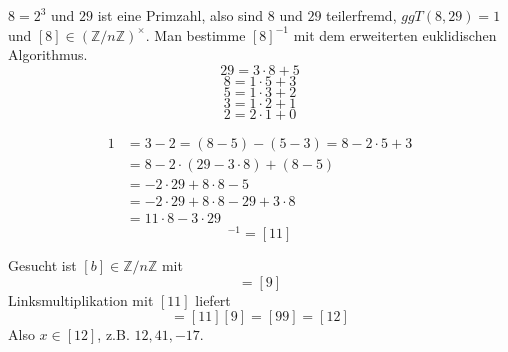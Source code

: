 \documentclass[10pt,a4paper]{article}
\begin{document}
$8 = 2^{3}$ und $29$ ist eine Primzahl, also sind $8$ und $29$ teilerfremd, $ggT(8, 29) = 1$ und $[8] \in (\mathbb{Z} / n \mathbb{Z})^{\times}$.
Man bestimme $[8]^{-1}$ mit dem erweiterten euklidischen Algorithmus.
\begin{equation}
  29 = 3 \cdot 8 + 5
\end{equation}
\begin{equation}
  8 = 1 \cdot 5 + 3
\end{equation}
\begin{equation}
  5 = 1 \cdot 3 + 2
\end{equation}
\begin{equation}
  3 = 1 \cdot 2 + 1
\end{equation}
\begin{equation}
  2 = 2 \cdot 1 + 0
\end{equation}

\begin{align*}
  1 & = 3 - 2 = (8 - 5) - (5 - 3) = 8 - 2 \cdot 5 + 3\\
  & = 8 - 2 \cdot (29 - 3 \cdot 8) + (8 - 5)\\
  & = -2 \cdot 29 + 8 \cdot 8 - 5\\
  & = -2 \cdot 29  + 8 \cdot 8 - 29 + 3 \cdot 8\\
  & = 11 \cdot 8 - 3 \cdot 29
\end{align*}
\begin{equation}
  [8]^{-1} = [11]
\end{equation}

Gesucht ist $[b] \in \mathbb{Z} / n \mathbb{Z}$ mit
\begin{equation}
  [8][b] = [9]
\end{equation}
Linksmultiplikation mit $[11]$ liefert
\begin{equation}
  [b] = [11][9] = [99] = [12]
\end{equation}
Also $x \in [12]$, z.B. $12, 41, -17$.
\end{document}
